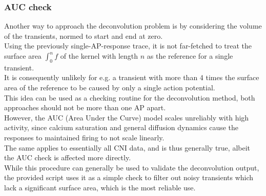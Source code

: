 \documentclass[titlepage]{article}
\begin{document}
\subsubsection{AUC check}
Another way to approach the deconvolution problem is by considering the volume of the transients, normed to start and end at zero.\\
Using the previously single-AP-response trace, it is not far-fetched to treat the surface area $\int_{0}^{n} f$ of the kernel with length $n$ as the reference for a single transient.\\
It is consequently unlikely for e.g. a transient with more than 4 times the surface area of the reference to be caused by only a single action potential.\\
This idea can be used as a checking routine for the deconvolution method, both approaches should not be more than one AP apart.\\
However, the AUC (Area Under the Curve) model scales unreliably with high activity, since calcium saturation and general diffusion dynamics cause the responses to maintained firing to not scale linearly.\\
The same applies to essentially all CNI data, and is thus generally true, albeit the AUC check is affected more directly.\\
While this procedure can generally be used to validate the deconvolution output, the provided script uses it as a simple check to filter out noisy transients which lack a significant surface area, which is the most reliable use.\\
\end{document}
